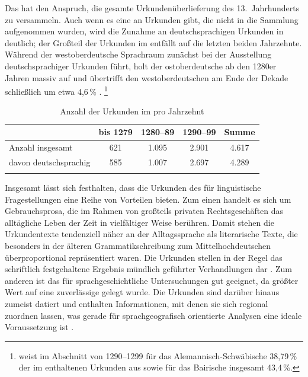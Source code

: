 Das \CAO{} hat den Anspruch, die gesamte
Urkundenüberlieferung des 13.~Jahrhunderts zu
versammeln. Auch wenn es eine  an Urkunden gibt, die nicht in
die Sammlung aufgenommen wurden, wird die Zunahme an deutschsprachigen Urkunden
in  deutlich; der Großteil der Urkunden im \CAO{} entfällt
auf die letzten beiden Jahrzehnte. Während der
westoberdeutsche Sprachraum zunächst
bei der Ausstellung deutschsprachiger Urkunden führt, holt der
ostoberdeutsche ab den 1280er Jahren massiv auf und übertrifft den
westoberdeutschen am Ende der Dekade schließlich um etwa
4,6\,\% \autocite[46--47]{ganslmayer2012}.%
%
	\footnote{\citet[47]{ganslmayer2012} weist im Abschnitt von 1290--1299 für
		das Alemannisch-Schwäbische 38,79\,\%
		der im \CAO{} enthaltenen Urkunden aus sowie für das
		Bairische insgesamt 43,4\,\%. }

\begin{table}
\centering
\caption{Anzahl der Urkunden im 
pro Jahrzehnt \autocite[40]{ganslmayer2012}}
\begin{tabularx}{\textwidth}{l C C C C}
\lsptoprule
%
	& \textbf{bis 1279}
	& \textbf{1280--89}
	& \textbf{1290--99}
	& \textbf{Summe}
	\\

\midrule

Anzahl insgesamt
	& 621
	& 1.095
	& 2.901
	& 4.617
	\\

davon deutschsprachig
	& 585
	& 1.007
	& 2.697
	& 4.289
	\\

\lspbottomrule
\end{tabularx}
\label{tab:urkstat}
\end{table}

Insgesamt lässt sich festhalten, dass die Urkunden des \CAO{} für
linguistische Fragestellungen eine Reihe von Vorteilen bieten. Zum einen
handelt es sich um Gebrauchsprosa, die im Rahmen
von großteils privaten Rechtsgeschäften das alltägliche Leben der Zeit in
vielfältiger Weise berühren. Damit stehen die Urkundentexte tendenziell näher
an der Alltagssprache als literarische Texte, die besonders in der älteren
Grammatikschreibung zum Mittelhochdeutschen überproportional repräsentiert
waren. Die Urkunden stellen in der Regel das schriftlich
festgehaltene Ergebnis mündlich geführter Verhandlungen dar
\autocite[595]{schmidtwiegand1998b}. Zum anderen ist das \CAO{} für
sprachgeschichtliche Untersuchungen gut geeignet, da
größter Wert auf eine zuverlässige  gelegt wurde. Die
Urkunden sind darüber hinaus zumeist datiert und enthalten Informationen, mit
denen sie sich regional zuordnen lassen, was gerade für
sprachgeografisch orientierte Analysen eine ideale
Voraussetzung ist \autocite[22]{schulze2011}.

